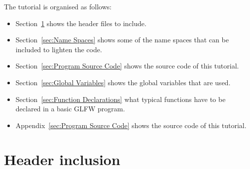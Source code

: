 \documentclass[11pt,oneside,a4paper,final]{article}
\begin{document}
The tutorial is organised as follows:
\begin{itemize}
 \item Section~\ref{sec:Header inclusion} shows the header files to include. 

 \item Section~\ref{sec:Name Spaces} shows some of the name spaces that can be 
	included to lighten the code. 

 \item Section~\ref{sec:Program Source Code} shows the source code of this 
	tutorial. 

 \item Section~\ref{sec:Global Variables} shows the global variables that are 
	used. 

 \item Section~\ref{sec:Function Declarations} what typical functions have to 
	be declared in a basic GLFW program. 

 \item Appendix~\ref{sec:Program Source Code} shows the source code of this 
	tutorial. 
	
\end{itemize}


\section{Header inclusion}
\label{sec:Header inclusion}
\end{document}
